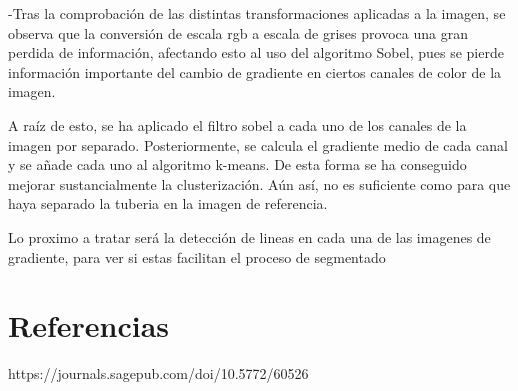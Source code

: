 \documentclass[12pt, a4paper]{article}
\begin{document}
-Tras la comprobación de las distintas transformaciones aplicadas a la imagen, se observa que la conversión de escala rgb a escala 
de grises provoca una gran perdida de información, afectando esto al uso del algoritmo Sobel, pues se pierde información importante del cambio de 
gradiente en ciertos canales de color de la imagen.

A raíz de esto, se ha aplicado el filtro sobel a cada uno de los canales de la imagen por separado. Posteriormente, se calcula el gradiente medio de cada
canal y se añade cada uno al algoritmo k-means. De esta forma se ha conseguido mejorar sustancialmente la clusterización. Aún así, no es suficiente como para que 
haya separado la tuberia en la imagen de referencia. 

Lo proximo a tratar será la detección de lineas en cada una de las imagenes de gradiente, para ver si estas facilitan el proceso de segmentado





\section{Referencias}

https://journals.sagepub.com/doi/10.5772/60526

\end{document}
